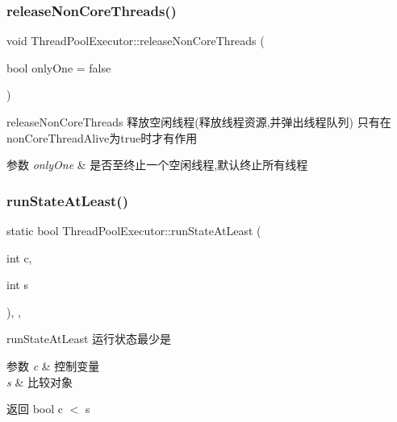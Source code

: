 \subsubsection{\texorpdfstring{release\+Non\+Core\+Threads()}{releaseNonCoreThreads()}}
{\footnotesize\ttfamily void Thread\+Pool\+Executor\+::release\+Non\+Core\+Threads (\begin{DoxyParamCaption}\item[{bool}]{only\+One = {\ttfamily false} }\end{DoxyParamCaption})}



release\+Non\+Core\+Threads 释放空闲线程(释放线程资源,并弹出线程队列) 只有在non\+Core\+Thread\+Alive为true时才有作用 


\begin{DoxyParams}{参数}
{\em only\+One} & 是否至终止一个空闲线程,默认终止所有线程 \\
\hline
\end{DoxyParams}
\mbox{\label{classThreadPoolExecutor_a5c20cff76deba933ace0f5a9f19ed5fd}} 
\subsubsection{\texorpdfstring{run\+State\+At\+Least()}{runStateAtLeast()}}
{\footnotesize\ttfamily static bool Thread\+Pool\+Executor\+::run\+State\+At\+Least (\begin{DoxyParamCaption}\item[{int}]{c,  }\item[{int}]{s }\end{DoxyParamCaption})\hspace{0.3cm}{\ttfamily [inline]}, {\ttfamily [static]}, {\ttfamily [protected]}}



run\+State\+At\+Least 运行状态最少是 


\begin{DoxyParams}{参数}
{\em c} & 控制变量 \\
\hline
{\em s} & 比较对象\\
\hline
\end{DoxyParams}
\begin{DoxyReturn}{返回}
bool c $<$ s 
\end{DoxyReturn}
\mbox{\label{classThreadPoolExecutor_a697d1afa93650fe597228fd5fb7b725b}} 
